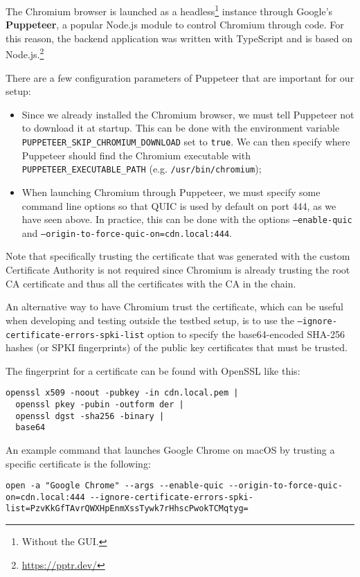 The Chromium browser is launched as a headless\footnote{Without the GUI.} instance through Google's \textbf{Puppeteer}, a popular Node.js module to control Chromium through code. For this reason, the backend application was written with TypeScript and is based on Node.js.\footnote{\url{https://pptr.dev/}}

There are a few configuration parameters of Puppeteer that are important for our setup:

\begin{itemize}
    \item Since we already installed the Chromium browser, we must tell Puppeteer not to download it at startup. This can be done with the environment variable \texttt{PUPPETEER\_SKIP\_CHROMIUM\_DOWNLOAD} set to \texttt{true}. We can then specify where Puppeteer should find the Chromium executable with \texttt{PUPPETEER\_EXECUTABLE\_PATH} (e.g. \texttt{/usr/bin/chromium});
    \item When launching Chromium through Puppeteer, we must specify some command line options so that QUIC is used by default on port 444, as we have seen above. In practice, this can be done with the options \texttt{--enable-quic} and \texttt{--origin-to-force-quic-on=cdn.local:444}.
\end{itemize}

Note that specifically trusting the certificate that was generated with the custom Certificate Authority is not required since Chromium is already trusting the root CA certificate and thus all the certificates with the CA in the chain.

An alternative way to have Chromium trust the certificate, which can be useful when developing and testing outside the testbed setup, is to use the \texttt{--ignore-certificate-errors-spki-list} option to specify the base64-encoded SHA-256 hashes (or SPKI fingerprints) of the public key certificates that must be trusted.

The fingerprint for a certificate can be found with OpenSSL like this:

\begin{verbatim}
openssl x509 -noout -pubkey -in cdn.local.pem |
  openssl pkey -pubin -outform der |
  openssl dgst -sha256 -binary |
  base64
\end{verbatim}

An example command that launches Google Chrome on macOS by trusting a specific certificate is the following:

\begin{verbatim}
open -a "Google Chrome" --args --enable-quic --origin-to-force-quic-on=cdn.local:444 --ignore-certificate-errors-spki-list=PzvKkGfTAvrQWXHpEnmXssTywk7rHhscPwokTCMqtyg=
\end{verbatim}

